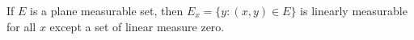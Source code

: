 If $E$ is a plane measurable set, then $E_x = \{y : (x, y) \in E\}$ is linearly measurable for all $x$ except a set of linear measure zero.

